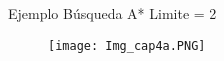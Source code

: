 \begin{frame}{Ejemplo Búsqueda A* }
    Limite = 2
    \begin{figure}\texttt{[image: Img\_cap4a.PNG]}\end{figure}
\end{frame}
